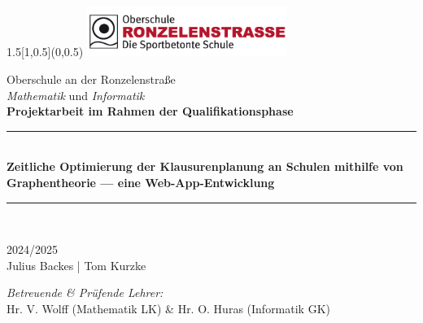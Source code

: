 \begin{titlepage}
\BgThispage
\begin{textblock}{1.5}[1,0.5](0,0.5)
	\includegraphics[width=6.5cm]{docs/logos/logoronzelen.png}\\[3.5cm]
  \end{textblock}
  

  
\bigskip
\bigskip
\begin{center}
{ \large{Oberschule an der Ronzelenstraße\\[0.2cm]
\textit{Mathematik} und \textit{Informatik}}}\\[1cm]

{\large \textbf{Projektarbeit im Rahmen der Qualifikationsphase}}\\[0.6cm]

\rule{\linewidth}{0.5mm} \\[0.1cm]
{ \huge \bfseries Zeitliche Optimierung der Klausurenplanung an Schulen mithilfe von Graphentheorie — eine Web-App-Entwicklung
 \\[0.1cm] }
\rule{\linewidth}{0.5mm} \\[1.5cm]

\noindent

{\large  
    2024/2025
  } \\[1cm] 

{\Large  
    Julius Backes | Tom Kurzke
  } \\

\begin{center}
    
\end{center}

{\textit{Betreuende \& Prüfende Lehrer:}}\\[0.3cm]
 {Hr. V. Wolff (Mathematik LK) \& Hr. O. Huras (Informatik GK)}




\end{center}


\end{titlepage}
